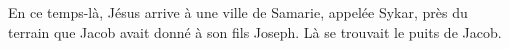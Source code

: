 En ce temps-là, Jésus arrive à une ville de Samarie, appelée Sykar,
	près du terrain que Jacob avait donné à son fils Joseph.
Là se trouvait le puits de Jacob.
